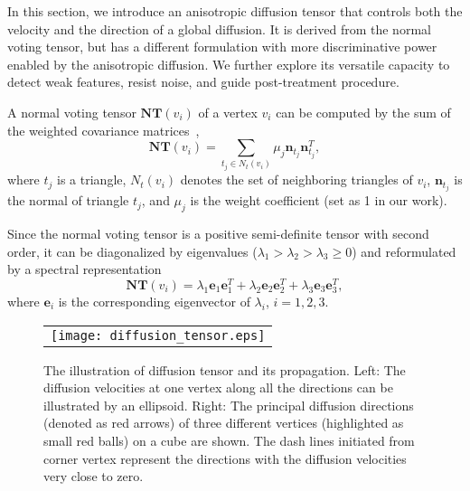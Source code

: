 \documentclass[10pt,journal,cspaper,compsoc]{IEEEtran}
\begin{document}
In this section, we introduce an anisotropic diffusion tensor that
controls both the velocity and the direction of a global diffusion. It
is derived from the normal voting tensor, but has a different
formulation with more discriminative power enabled by the anisotropic
diffusion. We further explore its versatile capacity to detect weak
features, resist noise, and guide post-treatment procedure.

A normal voting tensor $\textbf{NT}(v_i)$ of a vertex $v_i$ can be
computed by the sum of the weighted covariance
matrices~\cite{GM00,PSKP*02,KCL09},
\begin{equation}\label{eq:NVT}
\textbf{NT}(v_i) = \sum_{t_j\in{N_t(v_i)}}\mu_j \textbf{n}_{t_j}\textbf{n}_{t_j}^T,
\end{equation}
where $t_j$ is a triangle, $N_t(v_i)$ denotes the set of neighboring
triangles of $v_i$, $\textbf{n}_{t_j}$ is the normal of triangle
$t_j$, and $\mu_j$ is the weight coefficient (set as 1 in our work).

Since the normal voting tensor is a positive semi-definite tensor with
second order, it can be diagonalized by eigenvalues
($\lambda_1>\lambda_2>\lambda_3\geq 0$) and reformulated by a spectral
representation
\begin{equation}\label{eq:NVT_}
\textbf{NT}(v_i) = \lambda_1 \textbf{e}_1 \textbf{e}^T_1 +\lambda_2 \textbf{e}_2 \textbf{e}^T_2 +\lambda_3 \textbf{e}_3 \textbf{e}^T_3 ,
\end{equation}
where $\textbf{e}_i$ is the corresponding eigenvector of $\lambda_i$,
$i=1,2,3$.

\begin{figure}
\begin{center}
\begin{tabular}{@{}c@{}}
\texttt{[image: diffusion\_tensor.eps]} \\
\end{tabular}
\caption{The illustration of diffusion tensor and its propagation.
Left: The diffusion velocities at one vertex along all the directions
can be illustrated by an ellipsoid. Right: The principal diffusion
directions (denoted as red arrows) of three different vertices
(highlighted as small red balls) on a cube are shown. The dash lines
initiated from corner vertex represent the directions with the
diffusion velocities very close to zero. }
\label{fig:ellipsoid}
\end{center}
\end{figure}
\end{document}
